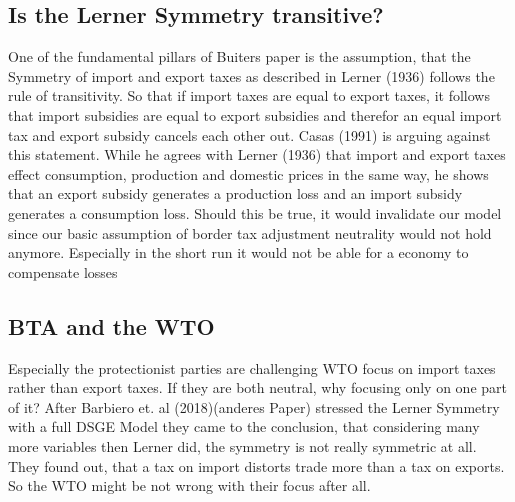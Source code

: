 \subsection{Is the Lerner Symmetry transitive?}
One of the fundamental pillars of Buiters paper is the assumption, that the Symmetry of import and export taxes as described in Lerner (1936) follows the rule of transitivity. So that if import taxes are equal to export taxes, it follows that import subsidies are equal to export subsidies and therefor an equal import tax and export subsidy cancels each other out. Casas (1991) is arguing against this statement. While he agrees with Lerner (1936) that import and export taxes effect consumption, production and domestic prices in the same way, he shows that an export subsidy generates a production loss and an import subsidy generates a consumption loss. Should this be true, it would invalidate our model since our basic assumption of border tax adjustment neutrality would not hold anymore. Especially in the short run it would not be able for a economy to compensate losses 

\subsection{BTA and the WTO}
Especially the protectionist parties are challenging WTO focus on import taxes rather than export taxes. If they are both neutral, why focusing only on one part of it? After Barbiero et. al (2018)(anderes Paper) stressed the Lerner Symmetry with a full DSGE Model they came to the conclusion, that considering many more variables then Lerner did, the symmetry is not really symmetric at all. They found out, that a tax on import distorts trade more than a tax on exports. So the WTO might be not wrong with their focus after all.
